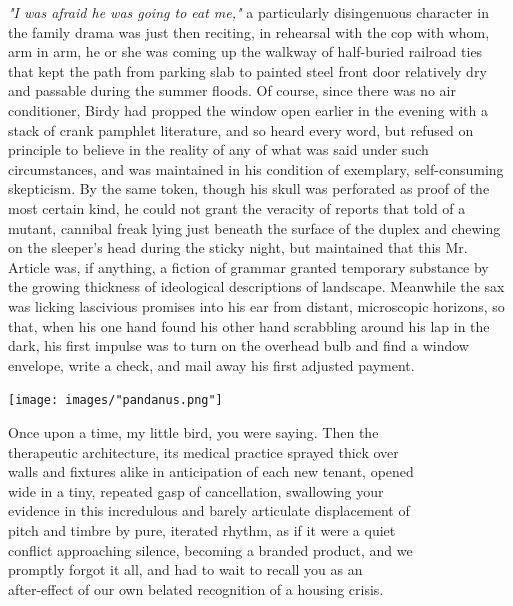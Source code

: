 \documentclass[
]{memoir}
\begin{document}
\emph{"I was afraid he was going to eat me,"} a particularly
disingenuous character in the family drama was just then reciting, in
rehearsal with the cop with whom, arm in arm, he or she was coming up
the walkway of half-buried railroad ties that kept the path from parking
slab to painted steel front door relatively dry and passable during the
summer floods. Of course, since there was no air conditioner, Birdy had
propped the window open earlier in the evening with a stack of crank
pamphlet literature, and so heard every word, but refused on principle
to believe in the reality of any of what was said under such
circumstances, and was maintained in his condition of exemplary,
self-consuming skepticism. By the same token, though his skull was
perforated as proof of the most certain kind, he could not grant the
veracity of reports that told of a mutant, cannibal freak lying just
beneath the surface of the duplex and chewing on the sleeper's head
during the sticky night, but maintained that this Mr. Article was, if
anything, a fiction of grammar granted temporary substance by the
growing thickness of ideological descriptions of landscape. Meanwhile
the sax was licking lascivious promises into his ear from distant,
microscopic horizons, so that, when his one hand found his other hand
scrabbling around his lap in the dark, his first impulse was to turn on
the overhead bulb and find a window envelope, write a check, and mail
away his first adjusted payment.

\begin{center}\texttt{[image: images/"pandanus.png"]}\end{center}

Once upon a time, my little bird, you were saying. Then the\\
therapeutic architecture, its medical practice sprayed thick over\\
walls and fixtures alike in anticipation of each new tenant, opened\\
wide in a tiny, repeated gasp of cancellation, swallowing your\\
evidence in this incredulous and barely articulate displacement of\\
pitch and timbre by pure, iterated rhythm, as if it were a quiet\\
conflict approaching silence, becoming a branded product, and we\\
promptly forgot it all, and had to wait to recall you as an\\
after-effect of our own belated recognition of a housing crisis.
\end{document}
